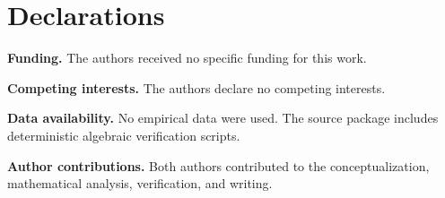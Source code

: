 \section*{Declarations}

\noindent\textbf{Funding.} The authors received no specific funding for this work.

\noindent\textbf{Competing interests.} The authors declare no competing interests.

\noindent\textbf{Data availability.} No empirical data were used.  The source
package includes deterministic algebraic verification scripts.

\noindent\textbf{Author contributions.} Both authors contributed to the
conceptualization, mathematical analysis, verification, and writing.




